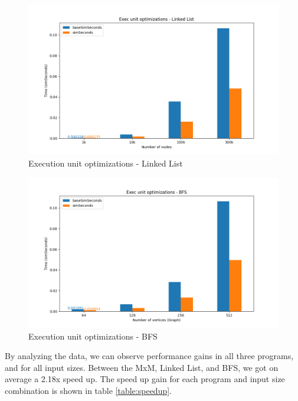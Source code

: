 \documentclass[
	article,			%
	11pt,				%
	oneside,			%
	a4paper,			%
	brazil,				%
        english,			%
	sumario=tradicional
	]{abntex2}
\begin{document}
\begin{figure}[H]
\caption{Execution unit optimizations - Linked List}
\label{fig:exec-opt-ll}
\includegraphics[width=\textwidth]{images/exec-opt-ll.png}
\end{figure}

\begin{figure}[H]
\caption{Execution unit optimizations - BFS}
\label{fig:exec-opt-bfs}
\includegraphics[width=\textwidth]{images/exec-opt-bfs.png}
\end{figure}

By analyzing the data, we can observe performance gains in all three programs, and for all input sizes. Between the MxM, Linked List, and BFS, we got on average a 2.18x speed up. The speed up gain for each program and input size combination is shown in table \ref{table:speedup}.
\end{document}
